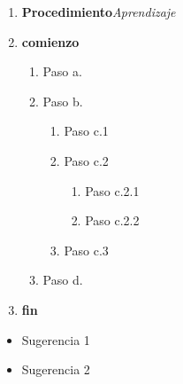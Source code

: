 \documentclass{article}
\begin{document}
	



\begin{enumerate}
	\item[\fbox{1.}] {\bf Procedimiento}{\em Aprendizaje}
	\item[\fbox{2.}] {\bf comienzo} %
	\begin{enumerate}
		\item Paso a.
		\item Paso b.
		\begin{enumerate}
			\item Paso c.1
			\item Paso c.2
			\begin{enumerate}
				\item Paso c.2.1
				\item Paso c.2.2
			\end{enumerate}
			\item Paso c.3
		\end{enumerate}
		\item Paso d.
	\end{enumerate}
	\item[\fbox{3.}] {\bf fin}
\end{enumerate}


\begin{itemize}
	\item {\red Sugerencia 1}
	\item {\red Sugerencia 2}
\end{itemize}	
	
	
\end{document}

